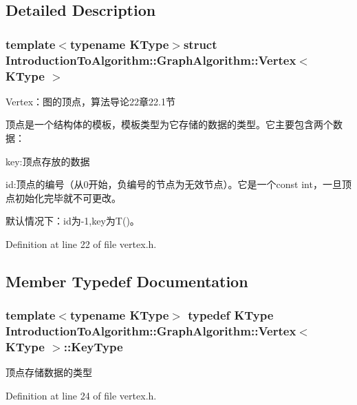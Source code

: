\subsection{Detailed Description}
\subsubsection*{template$<$typename K\+Type$>$struct Introduction\+To\+Algorithm\+::\+Graph\+Algorithm\+::\+Vertex$<$ K\+Type $>$}

Vertex：图的顶点，算法导论22章22.1节 

顶点是一个结构体的模板，模板类型为它存储的数据的类型。它主要包含两个数据：


\begin{DoxyItemize}
\item {\ttfamily key}\+:顶点存放的数据
\item {\ttfamily id}\+:顶点的编号（从0开始，负编号的节点为无效节点）。它是一个{\ttfamily const int}，一旦顶点初始化完毕就不可更改。
\end{DoxyItemize}

默认情况下：{\ttfamily id}为-\/1,{\ttfamily key}为{\ttfamily T()}。 

Definition at line 22 of file vertex.\+h.



\subsection{Member Typedef Documentation}
\hypertarget{struct_introduction_to_algorithm_1_1_graph_algorithm_1_1_vertex_a14e958c58a404474853491eb811954cc}{}
\subsubsection[{Key\+Type}]{\setlength{\rightskip}{0pt plus 5cm}template$<$typename K\+Type$>$ typedef K\+Type {\bf Introduction\+To\+Algorithm\+::\+Graph\+Algorithm\+::\+Vertex}$<$ K\+Type $>$\+::{\bf Key\+Type}}\label{struct_introduction_to_algorithm_1_1_graph_algorithm_1_1_vertex_a14e958c58a404474853491eb811954cc}
顶点存储数据的类型 

Definition at line 24 of file vertex.\+h.

